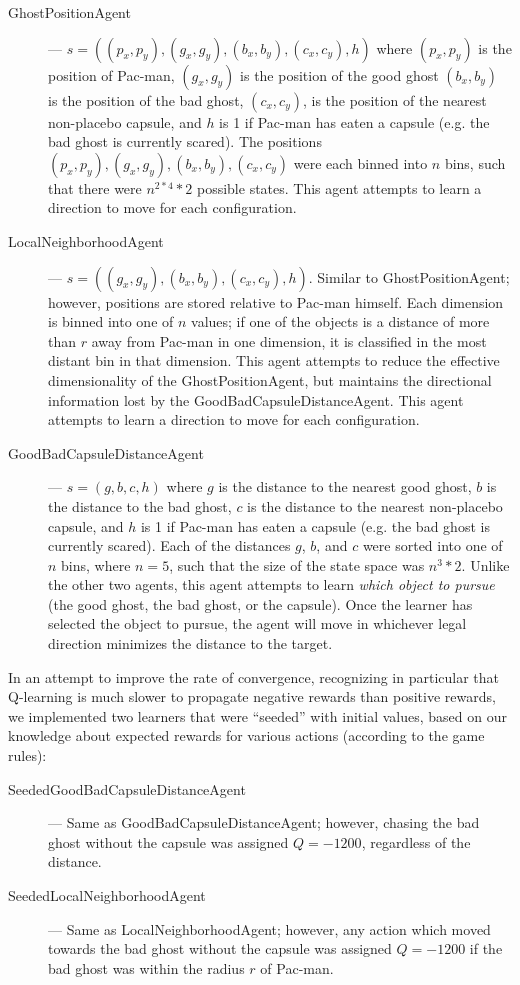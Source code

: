 \documentclass[11pt]{amsart}
\begin{document}
\begin{description}
	\item[GhostPositionAgent] --- $s = ((p_x, p_y), (g_x, g_y), (b_x, b_y), (c_x, c_y), h)$ where $(p_x, p_y)$ is the position of Pac-man, $(g_x, g_y)$ is the position of the good ghost $(b_x, b_y)$ is the position of the bad ghost, $(c_x, c_y)$, is the position of the nearest non-placebo capsule, and $h$ is 1 if Pac-man has eaten a capsule (e.g. the bad ghost is currently scared). The positions $(p_x, p_y), (g_x, g_y), (b_x, b_y), (c_x, c_y)$ were each binned into $n$ bins, such that there were $n^{2 * 4} * 2$ possible states. This agent attempts to learn a direction to move for each configuration.
	\item[LocalNeighborhoodAgent] --- $s = ((g_x, g_y), (b_x, b_y), (c_x, c_y), h)$. Similar to GhostPositionAgent; however, positions are stored relative to Pac-man himself. Each dimension is binned into one of $n$ values; if one of the objects is a distance of more than $r$ away from Pac-man in one dimension, it is classified in the most distant bin in that dimension. This agent attempts to reduce the effective dimensionality of the GhostPositionAgent, but maintains the directional information lost by the GoodBadCapsuleDistanceAgent. This agent attempts to learn a direction to move for each configuration.
	\item[GoodBadCapsuleDistanceAgent] --- $s = (g, b, c, h)$ where $g$ is the distance to the nearest good ghost, $b$ is the distance to the bad ghost, $c$ is the distance to the nearest non-placebo capsule, and $h$ is 1 if Pac-man has eaten a capsule (e.g. the bad ghost is currently scared). Each of the distances $g$, $b$, and $c$ were sorted into one of $n$ bins, where $n = 5$, such that the size of the state space was $n^3 * 2$. Unlike the other two agents, this agent attempts to learn \emph{which object to pursue} (the good ghost, the bad ghost, or the capsule). Once the learner has selected the object to pursue, the agent will move in whichever legal direction minimizes the distance to the target.  
\end{description}

In an attempt to improve the rate of convergence, recognizing in particular that Q-learning is much slower to propagate negative rewards than positive rewards, we implemented two learners that were ``seeded'' with initial values, based on our knowledge about expected rewards for various actions (according to the game rules):

\begin{description}
	\item[SeededGoodBadCapsuleDistanceAgent] --- Same as GoodBadCapsuleDistanceAgent; however, chasing the bad ghost without the capsule was assigned $Q = -1200$, regardless of the distance.
	\item[SeededLocalNeighborhoodAgent] --- Same as LocalNeighborhoodAgent; however, any action which moved towards the bad ghost without the capsule was assigned $Q = -1200$ if the bad ghost was within the radius $r$ of Pac-man.
\end{description}
\end{document}
